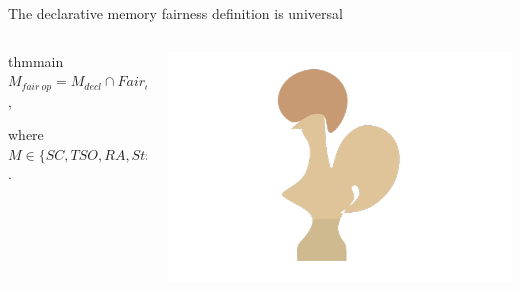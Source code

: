 \begin{frame}{The declarative memory fairness definition is universal}
  \begin{columns}
    
    \begin{column}{0.6\linewidth}
      \begin{center}
        \begin{restatable}{thm}{main}
          $M_{fair\ op} = M_{decl} \cap Fair_{decl}$,
          
          where $M \in \{SC, TSO, RA, StrongCoh\}$.
      \end{restatable}
    \end{center}    
  \end{column}
  
  \begin{column}{0.3\linewidth}
    \includegraphics[width=1\linewidth]{coq.png}
  \end{column}
  
\end{columns}

\end{frame}


